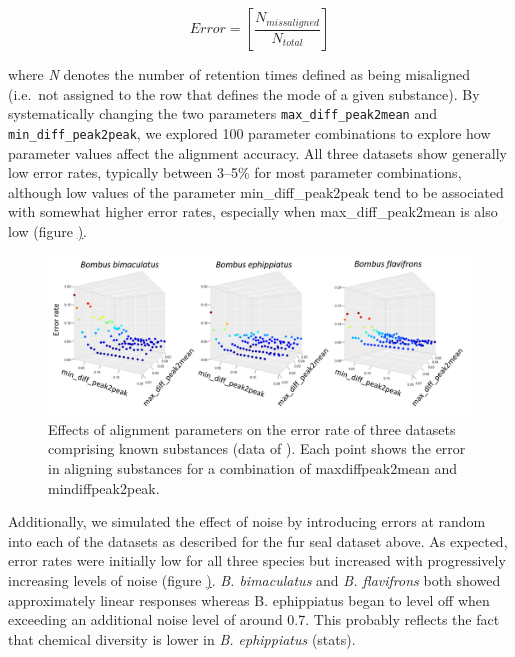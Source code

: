 \begin{equation}
\label{eq:three}
Error = \left[\frac{N_{missaligned}}{N_{total}}\right] 
\end{equation}

where \emph{N} denotes the number of retention times defined as being
misaligned (i.e.~not assigned to the row that defines the mode of a
given substance). By systematically changing the two parameters
\texttt{max\_diff\_peak2mean} and \texttt{min\_diff\_peak2peak}, we
explored 100 parameter combinations to explore how parameter values
affect the alignment accuracy. All three datasets show generally low
error rates, typically between 3--5\% for most parameter combinations,
although low values of the parameter min\_diff\_peak2peak tend to be
associated with somewhat higher error rates, especially when
max\_diff\_peak2mean is also low (figure \href{figure:parameterspace}).

\begin{figure}[htbp]
\centering
\includegraphics[width=13cm]{figures/parameter_space}
\caption{Effects of alignment parameters on the error rate of three datasets comprising known substances (data of \citet{Dellicour.2013}). Each point shows the error in aligning substances for a combination of max\textunderscore diff\textunderscore peak2mean and min\textunderscore diff\textunderscore peak2peak.}
\label{figure:parameterspace}
\end{figure}

Additionally, we simulated the effect of noise by introducing errors at
random into each of the datasets as described for the fur seal dataset
above. As expected, error rates were initially low for all three species
but increased with progressively increasing levels of noise (figure
\href{figure:noise}). \emph{B. bimaculatus} and \emph{B. flavifrons}
both showed approximately linear responses whereas B. ephippiatus began
to level off when exceeding an additional noise level of around 0.7.
This probably reflects the fact that chemical diversity is lower in
\emph{B. ephippiatus} (stats).

